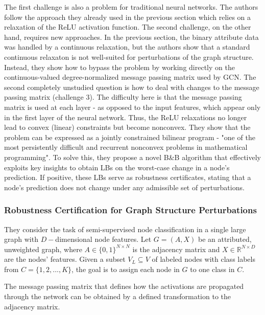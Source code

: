 \documentclass[a4paper,preprint]{sig-alternate}
\begin{document}
The first challenge is also a problem for traditional neural networks. The authors follow the approach they already used
in the previous section which relies on a relaxation of the ReLU activation function.\newline
The second challenge, on the other hand, requires new approaches. In the previous section, the binary attribute data
was handled by a continuous relaxation, but the authors show that a standard continuous relaxaton is not well-suited
for perturbations of the graph structure. Instead, they show how to bypass the problem by working directly on the 
continuous-valued degree-normalized message passing matrix used by GCN.\newline
The second completely unstudied question is how to deal with changes to the message passing matrix (challenge 3).
The difficulty here is that  the message passing matrix is used at each layer - as opposed to the input features,
which appear only in the first layer of the neural network. Thus, the ReLU relaxations no longer lead to convex (linear)
constraints but become nonconvex. They show that the problem can be expressed as a jointly constrained bilinear program
- "one of the most persistently difficult and recurrent nonconvex problems in mathematical programming".
To solve this, they propose a novel B\&B algorithm that effectively exploits key insights to obtain LBs on 
the worst-case change in a node's prediction. If positive, these LBs serve as robustness certificates, stating 
that a node's prediction does not change under any admissible set of perturbations.

\subsubsection{Robustness Certification for Graph Structure Perturbations}

They consider the task of semi-supervised node classification in a single large graph with $D-$dimensional
node features. Let $G = (A, X)$ be an attributed, unweighted graph, where $A \in \{0, 1\}^{N \times N}$ is the
adjacency matrix and $X \in \mathbb{R}^{N \times D}$ are the nodes' features. Given a subset $V_L \subseteq V$ of 
labeled nodes with class labels from $C = \{1, 2, ..., K\}$, the goal is to assign each node in $G$ to one class in $C$.\newline

The message passing matrix that defines how the activations are propagated through the network can be obtained
by a defined transformation to the adjacency matrix.\newline
\end{document}

